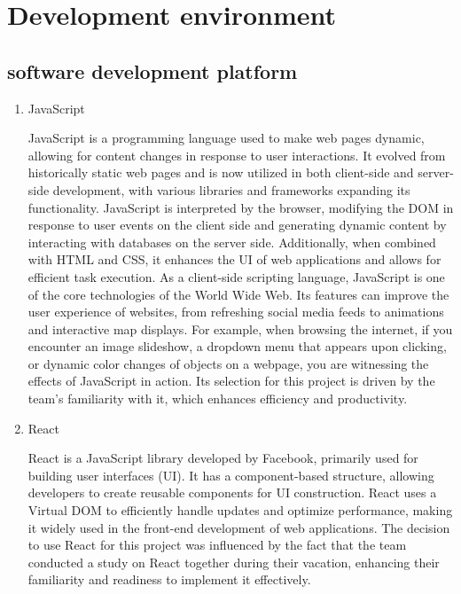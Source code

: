 \documentclass[conference]{IEEEtran}
\begin{document}
\section{Development environment}

\subsection{software development platform}

\begin{enumerate}[itemsep=2ex, parsep=1ex]
		
	\item JavaScript
	      	      
	      	      
	      JavaScript is a programming language used to make web pages dynamic, allowing for content changes in response to user interactions. It evolved from historically static web pages and is now utilized in both client-side and server-side development, with various libraries and frameworks expanding its functionality. JavaScript is interpreted by the browser, modifying the DOM in response to user events on the client side and generating dynamic content by interacting with databases on the server side. Additionally, when combined with HTML and CSS, it enhances the UI of web applications and allows for efficient task execution. As a client-side scripting language, JavaScript is one of the core technologies of the World Wide Web. Its features can improve the user experience of websites, from refreshing social media feeds to animations and interactive map displays. For example, when browsing the internet, if you encounter an image slideshow, a dropdown menu that appears upon clicking, or dynamic color changes of objects on a webpage, you are witnessing the effects of JavaScript in action. Its selection for this project is driven by the team's familiarity with it, which enhances efficiency and productivity.
	      	      
	\item React
	      	      
	      	      
	      React is a JavaScript library developed by Facebook, primarily used for building user interfaces (UI). It has a component-based structure, allowing developers to create reusable components for UI construction. React uses a Virtual DOM to efficiently handle updates and optimize performance, making it widely used in the front-end development of web applications. The decision to use React for this project was influenced by the fact that the team conducted a study on React together during their vacation, enhancing their familiarity and readiness to implement it effectively.
	      	      

\end{enumerate}
\end{document}
